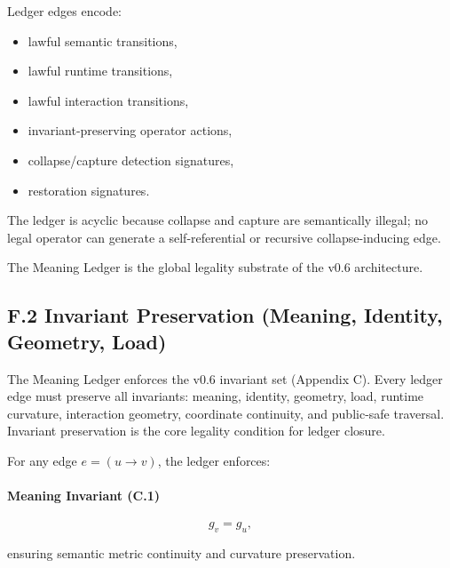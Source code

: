 \medskip

\noindent Ledger edges encode:

\begin{itemize}
    \item lawful semantic transitions,
    \item lawful runtime transitions,
    \item lawful interaction transitions,
    \item invariant-preserving operator actions,
    \item collapse/capture detection signatures,
    \item restoration signatures.
\end{itemize}

\medskip

\noindent The ledger is acyclic because collapse and capture are semantically
illegal; no legal operator can generate a self-referential or recursive
collapse-inducing edge.

\medskip

\noindent The Meaning Ledger is the global legality substrate of the v0.6
architecture.



\subsection*{F.2 Invariant Preservation (Meaning, Identity, Geometry, Load)}

\noindent The Meaning Ledger enforces the v0.6 invariant set (Appendix C). Every
ledger edge must preserve all invariants: meaning, identity, geometry, load,
runtime curvature, interaction geometry, coordinate continuity, and public-safe
traversal. Invariant preservation is the core legality condition for ledger
closure.

\medskip

\noindent For any edge $e = (u \rightarrow v)$, the ledger enforces:

\paragraph{Meaning Invariant (C.1)}


\[
g_v = g_u,
\]


ensuring semantic metric continuity and curvature preservation.

